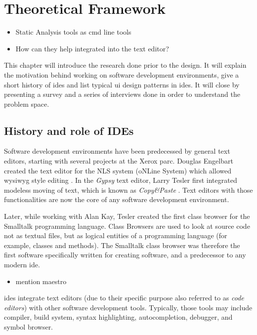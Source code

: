 \chapter{Theoretical Framework}\label{theoretical-framework}

\begin{itemize}
\itemsep1pt\parskip0pt
\item
  Static Analysis tools as cmd line tools
\item
  How can they help integrated into the text editor?
\end{itemize}

This chapter will introduce the research done prior to the design. It
will explain the motivation behind working on software development
environments, give a short history of \glspl{ide} and list typical
\gls{ui} design patterns in \glspl{ide}. It will close by presenting a
survey and a series of interviews done in order to understand the
problem space.

\section{History and role of IDEs}\label{history-and-role-of-ides}

Software development environments have been predecessed by general text
editors, starting with several projects at the Xerox \gls{parc}. Douglas
Engelbart created the text editor for the NLS system (oNLine System)
which allowed \gls{wysiwyg} style editing \cite[pp.]{moggridge}. In the
\emph{Gypsy} text editor, Larry Tesler first integrated modeless moving
of text, which is known as \emph{Copy\&Paste} \cite[pp.]{moggridge}.
Text editors with those functionalities are now the core of any software
development environment.

Later, while working with Alan Kay, Tesler created the first class
browser for the Smalltalk programming language. Class Browsers are used
to look at source code not as textual files, but as logical entities of
a programming language (for example, classes and methods). The Smalltalk
class browser was therefore the first software specifically written for
creating software, and a predecessor to any modern \gls{ide}.

\begin{itemize}
\itemsep1pt\parskip0pt
\item
  mention maestro
\end{itemize}

\glspl{ide} integrate text editors (due to their specific purpose also
referred to as \emph{code editors}) with other software development
tools. Typically, those tools may include compiler, build system, syntax
highlighting, autocompletion, debugger, and symbol browser.


